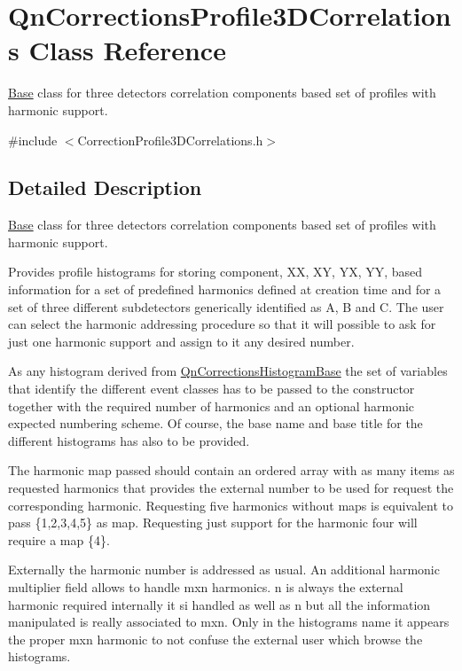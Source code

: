 \hypertarget{classQnCorrectionsProfile3DCorrelations}{}\section{Qn\+Corrections\+Profile3\+D\+Correlations Class Reference}
\label{classQnCorrectionsProfile3DCorrelations}


\mbox{\hyperlink{classBase}{Base}} class for three detectors correlation components based set of profiles with harmonic support.  




{\ttfamily \#include $<$Correction\+Profile3\+D\+Correlations.\+h$>$}



\subsection{Detailed Description}
\mbox{\hyperlink{classBase}{Base}} class for three detectors correlation components based set of profiles with harmonic support. 

Provides profile histograms for storing component, XX, XY, YX, YY, based information for a set of predefined harmonics defined at creation time and for a set of three different subdetectors generically identified as A, B and C. The user can select the harmonic addressing procedure so that it will possible to ask for just one harmonic support and assign to it any desired number.

As any histogram derived from \mbox{\hyperlink{classQnCorrectionsHistogramBase}{Qn\+Corrections\+Histogram\+Base}} the set of variables that identify the different event classes has to be passed to the constructor together with the required number of harmonics and an optional harmonic expected numbering scheme. Of course, the base name and base title for the different histograms has also to be provided.

The harmonic map passed should contain an ordered array with as many items as requested harmonics that provides the external number to be used for request the corresponding harmonic. Requesting five harmonics without maps is equivalent to pass \{1,2,3,4,5\} as map. Requesting just support for the harmonic four will require a map \{4\}.

Externally the harmonic number is addressed as usual. An additional harmonic multiplier field allows to handle mxn harmonics. n is always the external harmonic required internally it si handled as well as n but all the information manipulated is really associated to mxn. Only in the histograms name it appears the proper mxn harmonic to not confuse the external user which browse the histograms.

